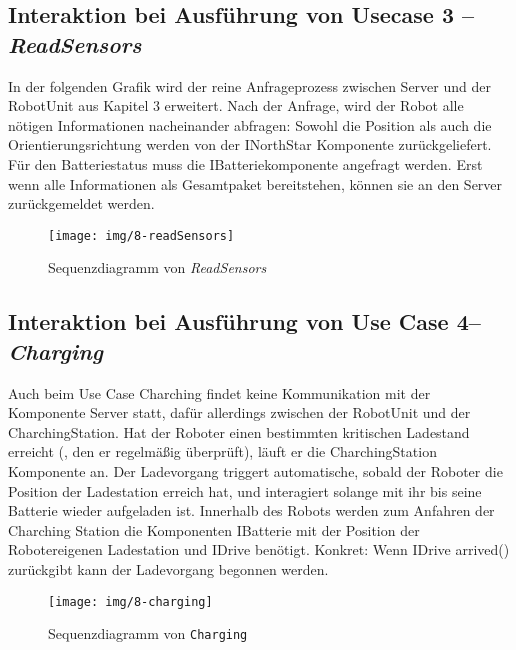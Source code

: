 	\subsection*{Interaktion bei Ausführung von Usecase 3 – \emph{ReadSensors}}
In der folgenden Grafik wird der reine Anfrageprozess zwischen Server und der RobotUnit aus Kapitel 3 erweitert. Nach der Anfrage, wird der Robot alle nötigen Informationen nacheinander abfragen: Sowohl die Position als auch die Orientierungsrichtung werden von der INorthStar Komponente zurückgeliefert. Für den Batteriestatus muss die IBatteriekomponente angefragt werden. Erst wenn alle Informationen als Gesamtpaket bereitstehen, können sie an den Server zurückgemeldet werden.
\\
	\begin{figure}[H]
		\centering
		\texttt{[image: img/8-readSensors]}
		\caption{Sequenzdiagramm von \emph{ReadSensors}}
		\label{ReadSensors}
	\end{figure}
	
	\subsection*{Interaktion bei Ausführung von Use Case 4– \emph{Charging}}
	Auch beim Use Case Charching findet keine Kommunikation mit der Komponente Server statt, dafür allerdings zwischen der RobotUnit und der CharchingStation. Hat der Roboter einen bestimmten kritischen Ladestand erreicht (, den er regelmäßig überprüft), läuft er die CharchingStation Komponente an. Der Ladevorgang triggert automatische, sobald der Roboter die Position der Ladestation erreich hat, und interagiert solange mit ihr bis seine Batterie wieder aufgeladen ist. Innerhalb des Robots werden zum Anfahren der Charching Station die Komponenten IBatterie mit der Position der Robotereigenen Ladestation und IDrive benötigt. Konkret: Wenn IDrive arrived() zurückgibt kann der Ladevorgang begonnen werden.

	
	\begin{figure}[H]
		\centering
		\texttt{[image: img/8-charging]}
		\caption{Sequenzdiagramm von \texttt{Charging}}
		\label{Charging}
	\end{figure}
